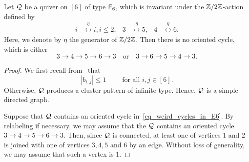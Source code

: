 \begin{lemma}\label{lemma:no weird cycles in E6}
Let $\mathcal{Q}$ be a quiver on $[6]$ of type $\mathsf{E}_6$, which is invariant under the $\mathbb{Z}/2\mathbb{Z}$-action defined by
\begin{align*}
i&\stackrel{\eta}{\longleftrightarrow} i, i\le 2,&
3&\stackrel{\eta}{\longleftrightarrow} 5,&
4&\stackrel{\eta}{\longleftrightarrow} 6.
\end{align*}
Here, we denote by $\eta$ the generator of $\mathbb{Z}/2\mathbb{Z}$.
Then there is no oriented cycle, which is either
\begin{equation}\label{eq_weird_cycles_in_E6}
3\to4\to5\to6\to3\quad\text{or}\quad
3\to6\to5\to4\to3.
\end{equation}
\end{lemma}
\begin{proof}
We first recall from~\cite[Theorem~1.8]{FZ2_2003} that 
\begin{equation}\label{equation_bij_le_1}
|b_{i,j}|\le 1 \qquad \text{ for all }i,j\in[6].
\end{equation} 
Otherwise, $\mathcal{Q}$ produces a cluster pattern of infinite type.
Hence, $\mathcal{Q}$ is a simple directed graph.

Suppose that $\mathcal{Q}$ contains an oriented cycle in~\eqref{eq_weird_cycles_in_E6}.
By relabeling if necessary, we may assume that the $\mathcal{Q}$ contains an oriented cycle $3\to4\to5\to6\to 3$.
Then, since $\mathcal{Q}$ is connected, at least one of vertices $1$ and $2$ is joined with one of vertices $3,4,5$ and $6$ by an edge.
Without loss of generality, we may assume that such a vertex is $1$.


\end{proof}
